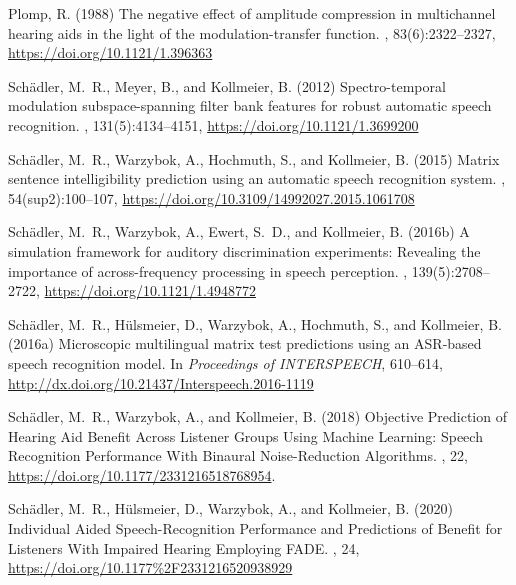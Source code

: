 \documentclass[10pt,a4paper,twocolumn]{article}
\begin{document}
\begin{thebibliography}{}
	Plomp, R. (1988)
	\newblock The negative effect of amplitude compression in multichannel hearing aids in the light of the modulation-transfer function.
	, 83(6):2322--2327, \url{https://doi.org/10.1121/1.396363}

	Schädler, M.~R., Meyer, B., and Kollmeier, B. (2012)
	\newblock Spectro-temporal modulation subspace-spanning filter bank features for robust automatic speech recognition.
	, 131(5):4134--4151, \url{https://doi.org/10.1121/1.3699200}
	
	Schädler, M.~R., Warzybok, A., Hochmuth, S., and Kollmeier, B. (2015)
	\newblock Matrix sentence intelligibility prediction using an automatic speech recognition system.
	, 54(sup2):100--107, \url{https://doi.org/10.3109/14992027.2015.1061708}
	
	Schädler, M.~R., Warzybok, A., Ewert, S.~D., and Kollmeier, B. (2016b)
	\newblock A simulation framework for auditory discrimination experiments: Revealing the importance of across-frequency processing in speech perception.
	, 139(5):2708--2722, \url{https://doi.org/10.1121/1.4948772}
	
	Schädler, M.~R., Hülsmeier, D., Warzybok, A., Hochmuth, S., and Kollmeier, B. (2016a)
	\newblock Microscopic multilingual matrix test predictions using an ASR-based speech recognition model.
	\newblock In {\em Proceedings of INTERSPEECH}, 610--614, \url{http://dx.doi.org/10.21437/Interspeech.2016-1119}
	
	Schädler, M.~R., Warzybok, A., and Kollmeier, B. (2018)
	\newblock Objective Prediction of Hearing Aid Benefit Across Listener Groups Using Machine Learning: Speech Recognition Performance With Binaural Noise-Reduction Algorithms.
	, 22, \url{https://doi.org/10.1177/2331216518768954}.
		
	Schädler, M.~R., Hülsmeier, D., Warzybok, A., and Kollmeier, B. (2020)
	\newblock Individual Aided Speech-Recognition Performance and Predictions of Benefit for Listeners With Impaired Hearing Employing FADE.
	, 24, \url{https://doi.org/10.1177%2F2331216520938929}
	

\end{thebibliography}
\end{document}
